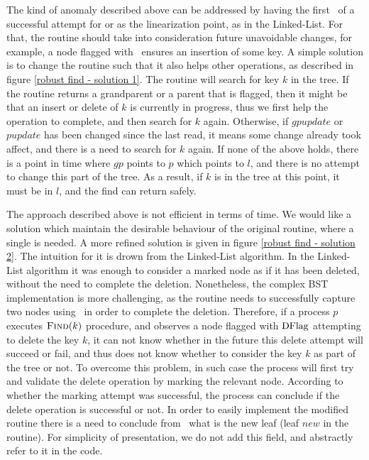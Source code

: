 The kind of anomaly described above can be addressed by having the first \CASB\ of a successful attempt for  or  as the linearization point, as in the Linked-List. For that, the  routine should take into consideration future unavoidable changes, for example, a node flagged with \insertflag\ ensures an insertion of some key. A simple solution is to change the  routine such that it also helps other operations, as described in figure \ref{robust find - solution 1}. The  routine will search for key $k$ in the tree. If the  routine returns a grandparent or a parent that is flagged, then it might be that an insert or delete of $k$ is currently in progress, thus we first help the operation to complete, and then search for $k$ again. Otherwise, if $gpupdate$ or $pupdate$ has been changed since the last read, it means some change already took affect, and there is a need to search for $k$ again. If none of the above holds, there is a point in time where $gp$ points to $p$ which points to $l$, and there is no attempt to change this part of the tree. As a result, if $k$ is in the tree at this point, it must be in $l$, and the find can return safely.

The approach described above is not efficient in terms of time. We would like a solution which maintain the desirable behaviour of the original  routine, where a single  is needed. A more refined solution is given in figure \ref{robust find - solution 2}. The intuition for it is drown from the Linked-List algorithm.
In the Linked-List algorithm it was enough to consider a marked node as if it has been deleted, without the need to complete the deletion. Nonetheless, the complex BST implementation is more challenging, as the  routine needs to successfully capture two nodes using \CASB\ in order to complete the deletion. Therefore, if a process $p$ executes $\mbox{\sc Find}(k)$ procedure, and observes a node flagged with $\mbox{DFlag}$ attempting to delete the key $k$, it can not know whether in the future this delete attempt will succeed or fail, and thus does not know whether to consider the key $k$ as part of the tree or not. To overcome this problem, in such case the process will first try and validate the delete operation by marking the relevant node. According to whether the marking attempt was successful, the process can conclude if the delete operation is successful or not.
In order to easily implement the modified  routine there is a need to conclude from \IFlag\ what is the new leaf (leaf $new$ in the  routine). For simplicity of presentation, we do not add this field, and abstractly refer to it in the code.

